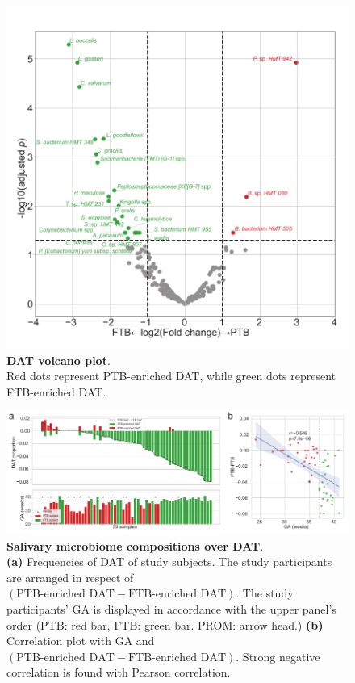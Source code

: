 \documentclass[11pt, a4paper, onecolumn, oneside]{report}
\begin{document}
            \begin{figure}[p]
                \centering
                \includegraphics[width=\linewidth]{Figures/PTB/Fig1-DAT.pdf}
                \caption[DAT volcano plot]{\textbf{DAT volcano plot}. \\
                    Red dots represent PTB-enriched DAT, while green dots represent FTB-enriched DAT.}
                \label{fig:PTB-DAT}
            \end{figure}
            \clearpage

            \begin{figure}[p]
                \centering
                \includegraphics[width=\linewidth]{Figures/PTB/Fig2-Composition.pdf}
                \caption[Salivary microbiome compositions over DAT]{\textbf{Salivary microbiome compositions over DAT}. \\
                    \textbf{(a)} Frequencies of DAT of study subjects. The study participants are arranged in respect of $(\textrm{PTB-enriched DAT} - \textrm{FTB-enriched DAT})$. The study participants' GA is displayed in accordance with the upper panel's order (PTB: red bar, FTB: green bar. PROM: arrow head.) \textbf{(b)} Correlation plot with GA and $(\textrm{PTB-enriched DAT} - \textrm{FTB-enriched DAT})$. Strong negative correlation is found with Pearson correlation.}
                \label{fig:PTB-composition}
            \end{figure}
            \clearpage
\end{document}
